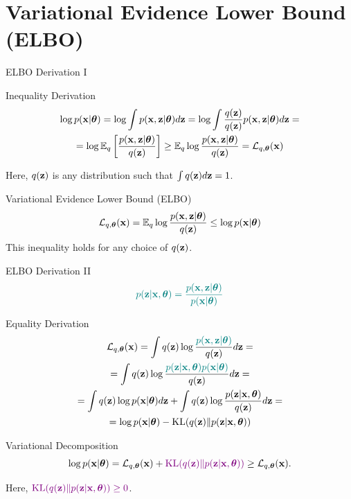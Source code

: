 \documentclass{beamer}
\begin{document}
\section{Variational Evidence Lower Bound (ELBO)}
\begin{frame}{ELBO Derivation I}
	\begin{block}{Inequality Derivation}
		\vspace{-0.7cm}
		\begin{multline*}
			\log p(\mathbf{x}| \boldsymbol{\theta}) 
			= \log \int p(\mathbf{x}, \mathbf{z} | \boldsymbol{\theta}) d\mathbf{z} = \log \int \frac{q(\mathbf{z})}{q(\mathbf{z})} p(\mathbf{x}, \mathbf{z} | \boldsymbol{\theta}) d\mathbf{z} = \\
			= \log \mathbb{E}_{q} \left[\frac{p(\mathbf{x}, \mathbf{z}| \boldsymbol{\theta})}{q(\mathbf{z})} \right] \geq \mathbb{E}_{q} \log \frac{p(\mathbf{x}, \mathbf{z}| \boldsymbol{\theta})}{q(\mathbf{z})} = \mathcal{L}_{q, \boldsymbol{\theta}}(\mathbf{x})
		\end{multline*}
		\vspace{-0.3cm}
	\end{block}
	Here, $q(\mathbf{z})$ is any distribution such that $\int q(\mathbf{z}) d\mathbf{z} = 1$.
	\begin{block}{Variational Evidence Lower Bound (ELBO)}
		\[
			 \mathcal{L}_{q, \boldsymbol{\theta}}(\mathbf{x}) = \mathbb{E}_{q} \log \frac{p(\mathbf{x}, \mathbf{z}| \boldsymbol{\theta})}{q(\mathbf{z})}  \leq \log p(\mathbf{x}| \boldsymbol{\theta}) 
		\]
		This inequality holds for any choice of $q(\mathbf{z})$.
	\end{block}
\end{frame}
\begin{frame}{ELBO Derivation II}
	\vspace{-0.3cm}
	\[
		{\color{teal}p(\mathbf{z}|\mathbf{x}, \boldsymbol{\theta}) = \frac{p(\mathbf{x}, \mathbf{z} | \boldsymbol{\theta})}{p(\mathbf{x}| \boldsymbol{\theta})}}
	\]
	\vspace{-0.4cm}
	\begin{block}{Equality Derivation}
		\vspace{-0.7cm}
		\begin{multline*}
			\mathcal{L}_{q, \boldsymbol{\theta}}(\mathbf{x}) = \int q(\mathbf{z}) \log \frac{\color{teal}p(\mathbf{x}, \mathbf{z} | \boldsymbol{\theta})}{q(\mathbf{z})}d\mathbf{z} = \\ 
			= \int q(\mathbf{z}) \log \frac{\color{teal}p(\mathbf{z}|\mathbf{x}, \boldsymbol{\theta})p(\mathbf{x}| \boldsymbol{\theta})}{q(\mathbf{z})}d\mathbf{z} = \\
			= \int q(\mathbf{z}) \log p(\mathbf{x}| \boldsymbol{\theta}) d\mathbf{z} + \int q(\mathbf{z}) \log \frac{p(\mathbf{z}|\mathbf{x}, \boldsymbol{\theta})}{q(\mathbf{z})}d\mathbf{z} = \\
			= \log p(\mathbf{x}| \boldsymbol{\theta}) - \mathrm{KL}(q(\mathbf{z}) \| p(\mathbf{z}|\mathbf{x}, \boldsymbol{\theta}))
		\end{multline*}
	\end{block}
	\vspace{-0.7cm}
	\begin{block}{Variational Decomposition}
		\vspace{-0.2cm}
		\[
			\log p(\mathbf{x}| \boldsymbol{\theta}) = \mathcal{L}_{q, \boldsymbol{\theta}}(\mathbf{x}) + {\color{violet}\mathrm{KL}(q(\mathbf{z}) \| p(\mathbf{z}|\mathbf{x}, \boldsymbol{\theta}))} \geq \mathcal{L}_{q, \boldsymbol{\theta}}(\mathbf{x}).
		\]
	\end{block}
	Here, ${\color{violet}\mathrm{KL}(q(\mathbf{z}) \| p(\mathbf{z}|\mathbf{x}, \boldsymbol{\theta})) \geq 0}$.
\end{frame}
\end{document}
